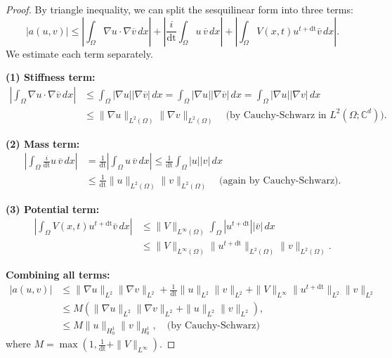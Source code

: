 \documentclass{article}
\theoremstyle{definition}
\theoremstyle{plain}
\theoremstyle{remark}
\newcommand{\dt}{\text{dt}}
\begin{document}
\begin{proof}
By triangle inequality, we can split the sesquilinear form into three terms:
\[
|a(u, v)| \leq \left|\int_\Omega \nabla u \cdot \nabla \overline{v} \, dx \right| + \left| \frac{i}{\dt} \int_\Omega u \, \overline{v} \, dx \right| + \left| \int_\Omega V(x,t) u^{t + \dt} \bar{v} \, dx \right|.
\]
We estimate each term separately.

\textbf{(1) Stiffness term:}
\begin{align*}
  \left| \int_\Omega \nabla u \cdot \nabla \overline{v} \, dx \right| &\leq \int_\Omega |\nabla u| |\nabla \overline{v}| \, dx = \int_\Omega |\nabla u| |\nabla \overline{v}| \, dx = \int_\Omega |\nabla u| |\nabla v| \, dx \\
  & \leq \|\nabla u\|_{L^2(\Omega)} \|\nabla v\|_{L^2(\Omega)}
\quad \text{(by Cauchy-Schwarz in } L^2(\Omega; \mathbb{C}^d) \text{)}.
\end{align*}


\textbf{(2) Mass term:}
\begin{align*}
\left| \int_\Omega \frac{i}{\dt} u \, \overline{v} \, dx \right|
&= \frac{1}{\dt} \left| \int_\Omega u \, \overline{v} \, dx \right| \leq \frac{1}{\dt} \int_\Omega |u| |v| \, dx \\
& \leq \frac{1}{\dt} \|u\|_{L^2(\Omega)} \|v\|_{L^2(\Omega)} \quad \text{(again by Cauchy-Schwarz)}.
\end{align*}


\textbf{(3) Potential term:}
\begin{align*}
\left| \int_\Omega V(x,t) u^{t + \dt} \bar{v} \, dx \right| &\leq \|V\|_{L^\infty(\Omega )} \int_\Omega |u^{t + \dt}| |\bar{v}| \, dx \\
&\leq \|V\|_{L^\infty(\Omega)} \|u^{t + \dt}\|_{L^2(\Omega)} \|v\|_{L^2(\Omega)}.
\end{align*}

\textbf{Combining all terms:}
\begin{align*}
|a(u, v)| &\leq \|\nabla u\|_{L^2} \|\nabla v\|_{L^2} + \frac{1}{\dt} \|u\|_{L^2} \|v\|_{L^2} + \|V\|_{L^\infty} \|u^{t + \dt}\|_{L^2} \|v\|_{L^2}\\
& \leq M \left( \|\nabla u\|_{L^2} \|\nabla v\|_{L^2} + \|u\|_{L^2} \|v\|_{L^2} \right),\\
&\leq M \|u\|_{H_0^1} \|v\|_{H_0^1}, \quad \text{(by Cauchy-Schwarz)}
\end{align*}
where \( M = \max\left(1, \frac{1}{\dt} + \|V\|_{L^\infty}\right) \).

\end{proof}
\end{document}
